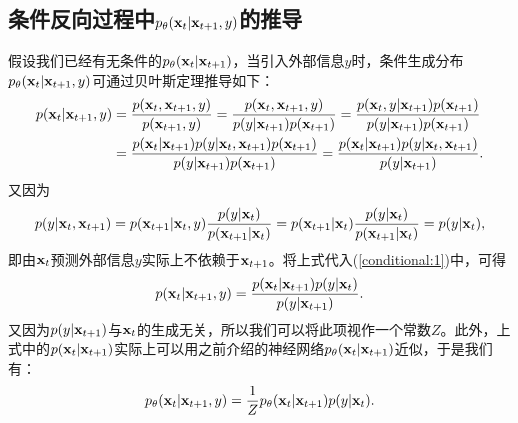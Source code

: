 \documentclass[11pt,a4paper,UTF8]{ctexart}
\begin{document}
\begin{appendices}
\section{条件反向过程中$p_{\theta}(\mathbf{x}_{t}|\mathbf{x}_{t+1},y)$的推导}
\label{app:conditional_reverse}

假设我们已经有无条件的$p_{\theta}(\mathbf{x}_{t}|\mathbf{x}_{t+1})$，当引入外部信息$y$时，条件生成分布$p_{\theta}(\mathbf{x}_{t}|\mathbf{x}_{t+1},y)$可通过贝叶斯定理推导如下：
\begin{align}
\begin{split}
    p(\mathbf{x}_{t}|\mathbf{x}_{t+1},y) &= \frac{p(\mathbf{x}_{t},\mathbf{x}_{t+1},y)}{p(\mathbf{x}_{t+1},y)} = \frac{p(\mathbf{x}_{t},\mathbf{x}_{t+1},y)}{p(y|\mathbf{x}_{t+1})p(\mathbf{x}_{t+1})} = \frac{p(\mathbf{x}_{t},y|\mathbf{x}_{t+1})p(\mathbf{x}_{t+1})}{p(y|\mathbf{x}_{t+1})p(\mathbf{x}_{t+1})} \\
    &= \frac{p(\mathbf{x}_{t}|\mathbf{x}_{t+1}) p(y|\mathbf{x}_{t},\mathbf{x}_{t+1})p(\mathbf{x}_{t+1})}{p(y|\mathbf{x}_{t+1})p(\mathbf{x}_{t+1})} = \frac{p(\mathbf{x}_{t}|\mathbf{x}_{t+1}) p(y|\mathbf{x}_{t},\mathbf{x}_{t+1})}{p(y|\mathbf{x}_{t+1})}.
\end{split}
\label{conditional:1}
\end{align}
又因为
\begin{equation*}
    p(y|\mathbf{x}_{t},\mathbf{x}_{t+1})=p(\mathbf{x}_{t+1}|\mathbf{x}_t,y)\frac{p(y|\mathbf{x}_t)}{p(\mathbf{x}_{t+1}|\mathbf{x}_t)} = p(\mathbf{x}_{t+1}|\mathbf{x}_t)\frac{p(y|\mathbf{x}_t)}{p(\mathbf{x}_{t+1}|\mathbf{x}_t)} = p(y|\mathbf{x}_t),
\end{equation*}
即由$\mathbf{x}_t$预测外部信息$y$实际上不依赖于$\mathbf{x}_{t+1}$。将上式代入(\ref{conditional:1})中，可得
\begin{equation*}
    p(\mathbf{x}_{t}|\mathbf{x}_{t+1},y) = \frac{p(\mathbf{x}_{t}|\mathbf{x}_{t+1})p(y|\mathbf{x}_t)}{p(y|\mathbf{x}_{t+1})}.
\end{equation*}
又因为$p(y|\mathbf{x}_{t+1})$与$\mathbf{x}_{t}$的生成无关，所以我们可以将此项视作一个常数$Z$。此外，上式中的$p(\mathbf{x}_{t}|\mathbf{x}_{t+1})$实际上可以用之前介绍的神经网络$p_\theta(\mathbf{x}_{t}|\mathbf{x}_{t+1})$近似，于是我们有：
\begin{equation*}
    p_{\theta}(\mathbf{x}_{t}|\mathbf{x}_{t+1},y) = \frac{1}{Z} p_\theta(\mathbf{x}_{t}|\mathbf{x}_{t+1})p(y|\mathbf{x}_t).
\end{equation*}

\end{appendices}
\end{document}
